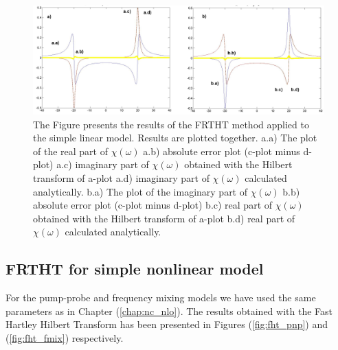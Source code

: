 \documentclass[12pt,twoside,a4paper]{article}
\numberwithin{equation}{subsection}
\numberwithin{figure}{subsection}
\begin{document}
\begin{figure} 
  \includegraphics[width=150mm]{img/fht_lin.png}
  \caption{The Figure presents the results of the FRTHT method applied to the simple linear
  model. Results are plotted together.
   a.a) The plot of the real part of $\chi (\omega )$ 
   a.b) absolute error plot (c-plot minus d-plot) 
   a.c) imaginary part of $\chi (\omega )$ obtained with the Hilbert transform of a-plot 
   a.d) imaginary part of $\chi (\omega )$  calculated analytically. 
   b.a) The plot of the imaginary part of $\chi (\omega )$ 
   b.b) absolute error plot (c-plot minus d-plot) 
   b.c) real part of $\chi (\omega )$ obtained with the Hilbert transform of a-plot 
   b.d) real part of $\chi (\omega )$ calculated analytically. \label{fig:fht_lin}
  }
\end{figure}

\subsection{FRTHT for simple nonlinear model} \label{chap:hartley_nlo}

For the pump-probe and frequency mixing models we have used the same parameters as in Chapter (\ref{chap:nc_nlo}). The results
obtained with the Fast Hartley Hilbert Transform has been presented in Figures (\ref{fig:fht_pnp}) and (\ref{fig:fht_fmix})
respectively.
\end{document}
